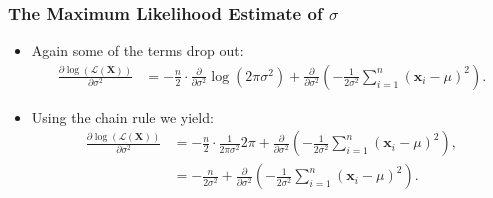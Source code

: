 \begin{frame}
	\frametitle{The Maximum Likelihood Estimate of $\sigma$}
	\begin{itemize}
		\item Again some of the terms drop out:
		      \begin{align}
			      \frac{\partial \log\left(\mathcal{L}(\mathbf{X})\right)}{\partial \sigma^2} & = - \frac{n}{2} \cdot \frac{\partial}{\partial\sigma^2} \log\left(2\pi\sigma^2\right) + \frac{\partial}{\partial\sigma^2}\left( -\frac{1}{2\sigma^2} \sum_{i=1}^{n} (\mathbf{x}_i-\mu)^2 \right).
		      \end{align}
		\item Using the chain rule we yield:
		      \begin{align}
			      \frac{\partial \log\left(\mathcal{L}(\mathbf{X})\right)}{\partial \sigma^2} & = - \frac{n}{2} \cdot \frac{1}{2\pi\sigma^2} 2\pi + \frac{\partial}{\partial\sigma^2}\left( -\frac{1}{2\sigma^2} \sum_{i=1}^{n} (\mathbf{x}_i-\mu)^2 \right), \\
			                                                                                  & = - \frac{n}{2\sigma^2} + \frac{\partial}{\partial\sigma^2}\left( -\frac{1}{2\sigma^2} \sum_{i=1}^{n} (\mathbf{x}_i-\mu)^2 \right).
		      \end{align}
	\end{itemize}
\end{frame}


